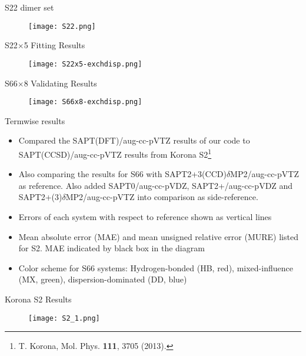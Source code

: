 \documentclass{beamer}
\begin{document}
        \begin{frame}{S22 dimer set}
            \begin{figure}
                \centering
                \texttt{[image: S22.png]}
            \end{figure}
        \end{frame}

        \begin{frame}{S22$\times$5 Fitting Results}
            \begin{figure}
                \centering
                \texttt{[image: S22x5-exchdisp.png]}
            \end{figure}   
        \end{frame}

        \begin{frame}{S66$\times$8 Validating Results}
            \begin{figure}
                \centering
                \texttt{[image: S66x8-exchdisp.png]}
            \end{figure}  
        \end{frame}

        \begin{frame}{Termwise results}
            \begin{itemize}
                \item Compared the SAPT(DFT)/aug-cc-pVTZ results of our code to SAPT(CCSD)/aug-cc-pVTZ results from Korona S2\footnote{T. Korona, Mol. Phys. \textbf{111}, 3705 (2013).}
                \item Also comparing the results for S66 with SAPT2+3(CCD)$\delta$MP2/aug-cc-pVTZ as reference. Also added SAPT0/aug-cc-pVDZ, SAPT2+/aug-cc-pVDZ and SAPT2+(3)$\delta$MP2/aug-cc-pVTZ into comparison as side-reference. 
                \item Errors of each system with respect to reference shown as vertical lines
                \item Mean absolute error (MAE) and mean unsigned relative error (MURE) listed for S2. MAE indicated by black box in the diagram
                \item Color scheme for S66 systems: Hydrogen-bonded (HB, red), mixed-influence (MX, green), dispersion-dominated (DD, blue)
            \end{itemize}
        \end{frame}

        \begin{frame}{Korona S2 Results}
            \begin{figure}
                \centering
                \texttt{[image: S2\_1.png]}
            \end{figure}  
        \end{frame}
\end{document}
